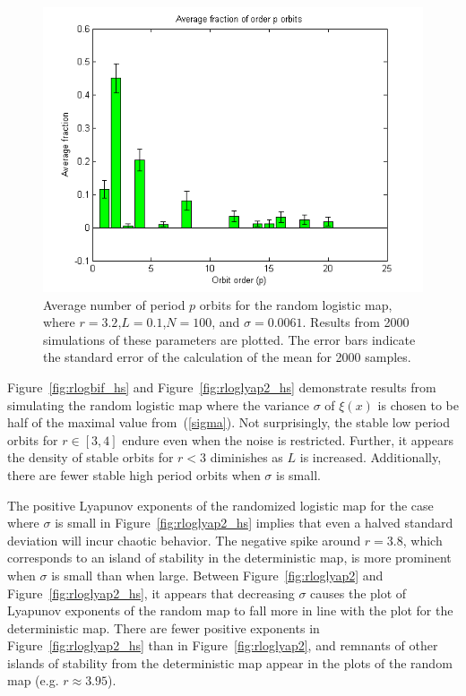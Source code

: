 \begin{figure}[H]\linespread{1}
\caption[Average number of period $p$ orbits for the random logistic
map, $\sigma=\sigma_{max}$]{Average number of period $p$ orbits for the random logistic
map, where $r =3.2$,$L=0.1$,$N=100$, and $\sigma = 0.0061$. Results from 2000
simulations of these parameters are plotted. The error bars indicate
the standard error of the calculation of the mean for 2000 samples.}\label{fig:rloghist}
	\begin{center}
          \includegraphics[scale=0.65]{figs/rlog_hist_r32_L01.png}
	\end{center}
\end{figure}

Figure~\ref{fig:rlogbif_hs} and Figure~\ref{fig:rloglyap2_hs}
demonstrate results from simulating the random logistic map where the
variance $\sigma$ of $\xi(x)$ is chosen to be half of the maximal
value from~(\ref{sigma}). Not surprisingly, the stable low period
orbits for $r \in [3,4]$ endure even
when the noise is restricted. Further, it appears the density of
stable orbits for $r<3$ diminishes as $L$ is increased. Additionally,
there are fewer stable high period orbits when $\sigma$ is small.

The positive Lyapunov exponents of the randomized logistic
map for the case where $\sigma$ is small in
Figure~\ref{fig:rloglyap2_hs} implies that even a halved standard
deviation will incur chaotic behavior. The negative spike around
$r=3.8$, which corresponds to an island of stability in the
deterministic map, is more prominent when $\sigma$ is small than when large. Between
Figure~\ref{fig:rloglyap2} and Figure~\ref{fig:rloglyap2_hs}, it
appears that decreasing $\sigma$ causes the plot of Lyapunov exponents
of the random map to fall more in line with the plot for the
deterministic map. There are fewer positive exponents in
Figure~\ref{fig:rloglyap2_hs} than in Figure~\ref{fig:rloglyap2}, and
remnants of other islands of stability from the deterministic map
appear in the plots of the random map (e.g. $r \approx 3.95$).

